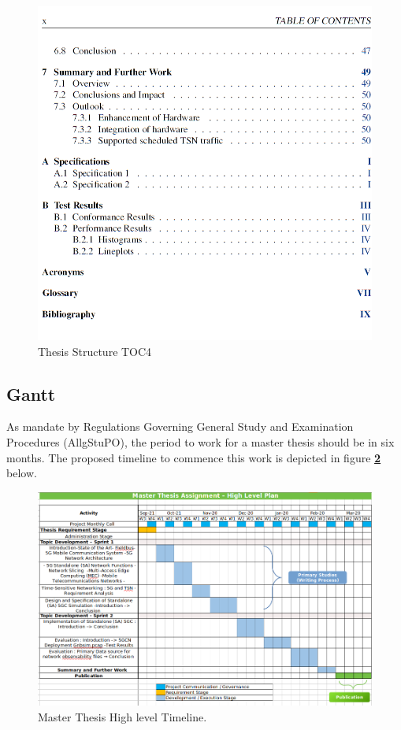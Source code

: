 \begin{figure}
\centering
\includegraphics[scale=0.40]{images/Thesis-TOC4.png}
\caption{Thesis Structure TOC4}
\label{fig:Thesis-TOC4}
 \end{figure}
 
\clearpage


\subsection{\textbf{Gantt}}\label{Gantt timeline- with milestones and overall planned duration}

As mandate by Regulations Governing General Study and Examination Procedures (AllgStuPO), the period to work for a master thesis should be in six months.
The proposed timeline to commence this work is depicted in figure \textbf{\ref{fig:Thesis_High-level_Timeline}}
below.
 
 
 
\begin{figure}
 
\centering
\includegraphics[scale=0.35]{images/Timeline_OS_5GC.png}
\caption{Master Thesis High level Timeline.}
\label{fig:Thesis_High-level_Timeline}
  \end{figure}

 



